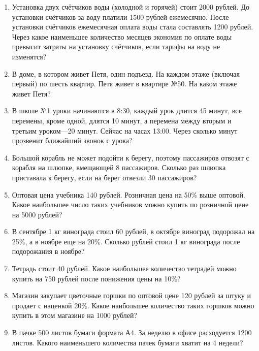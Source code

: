 \begin{enumerate}
	\item Установка  двух  счётчиков  воды  (холодной  и  горячей)  стоит  2000  рублей.  До 
	установки  счётчиков  за  воду  платили  1500  рублей  ежемесячно.  После  установки 
	счётчиков  ежемесячная  оплата  воды  стала  составлять  1200  рублей.  Через  какое 
	наименьшее  количество  месяцев  экономия  по  оплате  воды  превысит  затраты  на 
	установку счётчиков, если тарифы на воду не изменятся? 
	
	\item В доме, в котором живет Петя, один подъезд. На каждом этаже (включая первый) 
	по шесть квартир. Петя живет в квартире №50. На каком этаже живет Петя?
	
	\item В школе №1 уроки начинаются в 8:30, каждый урок длится 45 минут, все перемены, 
	кроме  одной,  длятся  10  минут,  а  перемена  между  вторым  и  третьим  уроком—20 
	минут.  Сейчас  на  часах  13:00.  Через  сколько  минут  прозвенит  ближайший  звонок  с 
	урока? 
	
	\item Большой  корабль  не  может  подойти  к  берегу,  поэтому  пассажиров  отвозят  с 
	корабля  на  шлюпке,  вмещающей  8  пассажиров.  Сколько  раз  шлюпка  приставала  к 
	берегу, если на берег отвезли 30 пассажиров?
	
	\item Оптовая  цена  учебника  140  рублей.  Розничная  цена  на  50\% выше  оптовой.  Какое 
	наибольшее число таких учебников можно купить по розничной цене на 5000 рублей?
	
	\item В сентябре 1 кг винограда стоил 60 рублей, в октябре виноград подорожал на 25\%, 
	а  в  ноябре  еще  на  20\%.  Сколько  рублей  стоил  1  кг  винограда  после  подорожания  в 
	ноябре?
			
	\item Тетрадь стоит 40 рублей. Какое наибольшее количество тетрадей можно купить на 750 рублей после понижения цены на 10\%?
	
	\item Магазин закупает цветочные горшки по оптовой цене 120 рублей за штуку и продает с наценкой 20\%. Какое наибольшее количество таких горшков можно купить в этом магазине на 1000 рублей?
	
	\item В пачке 500 листов бумаги формата А4. За неделю в офисе расходуется 1200 листов. Какого наименьшего количества пачек бумаги хватит на 4 недели?
	

\end{enumerate}
